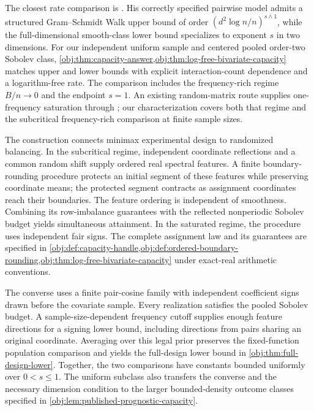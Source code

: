 \documentclass[11pt]{article}
\begin{document}
The closest rate comparison is \citet[Theorem B.8(ii), Lemma B.9, and Theorem 4.9]{Cytrynbaum2026Limits}. His correctly specified pairwise model admits a structured Gram--Schmidt Walk upper bound of order \((d^2\log n/n)^{s\wedge1}\), while the full-dimensional smooth-class lower bound specializes to exponent \(s\) in two dimensions. For our independent uniform sample and centered pooled order-two Sobolev class, \cref{obj:thm:capacity-answer,obj:thm:log-free-bivariate-capacity} matches upper and lower bounds with explicit interaction-count dependence and a logarithm-free rate. The comparison includes the frequency-rich regime \(B/n\to0\) and the endpoint \(s=1\). An existing random-matrix route supplies one-frequency saturation through \citet[Theorem 1.2(2a)]{KoganNandyHuang2024Extremal}; our characterization covers both that regime and the subcritical frequency-rich comparison at finite sample sizes.

The construction connects minimax experimental design \citep[Sections 2.2--2.4]{Kallus2018} to randomized balancing. In the subcritical regime, independent coordinate reflections and a common random shift supply ordered real spectral features. A finite boundary-rounding procedure protects an initial segment of these features while preserving coordinate means; the protected segment contracts as assignment coordinates reach their boundaries. The feature ordering is independent of smoothness. Combining its row-imbalance guarantees with the reflected nonperiodic Sobolev budget yields simultaneous attainment. In the saturated regime, the procedure uses independent fair signs. The complete assignment law and its guarantees are specified in \cref{obj:def:capacity-handle,obj:def:ordered-boundary-rounding,obj:thm:log-free-bivariate-capacity} under exact-real arithmetic conventions.

The converse uses a finite pair-cosine family with independent coefficient signs drawn before the covariate sample. Every realization satisfies the pooled Sobolev budget. A sample-size-dependent frequency cutoff supplies enough feature directions for a signing lower bound, including directions from pairs sharing an original coordinate. Averaging over this legal prior preserves the fixed-function population comparison and yields the full-design lower bound in \cref{obj:thm:full-design-lower}. Together, the two comparisons have constants bounded uniformly over \(0<s\leq1\). The uniform subclass also transfers the converse and the necessary dimension condition to the larger bounded-density outcome classes specified in \cref{obj:lem:published-prognostic-capacity}.
\end{document}
